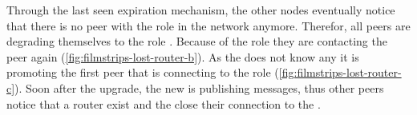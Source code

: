 Through the last seen expiration mechanism, the other nodes eventually notice that there is no peer with the role \router in the network anymore. Therefor, all peers are degrading themselves to the role \newbie. Because of the \newbie role they are contacting the \signal peer again (\vref{fig:filmstrips-lost-router-b}). As the \signal does not know any \router it is promoting the first peer that is connecting to the role \router (\vref{fig:filmstrips-lost-router-c}). Soon after the upgrade, the new \router is publishing \routerAlive messages, thus other peers notice that a router exist and the close their connection to the \signal.